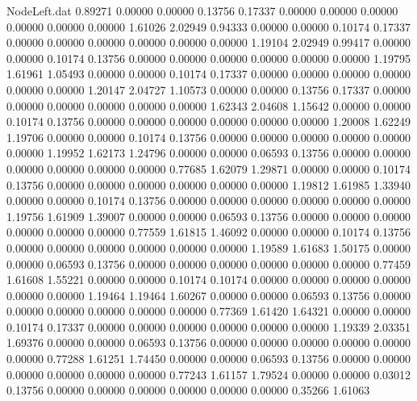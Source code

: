 \begin{filecontents}{NodeLeft.dat}
   0.89271    0.00000    0.00000     0.13756    0.17337    0.00000    0.00000    0.00000    0.00000    0.00000    0.00000    1.61026    2.02949
   0.94333    0.00000    0.00000     0.10174    0.17337    0.00000    0.00000    0.00000    0.00000    0.00000    0.00000    1.19104    2.02949
   0.99417    0.00000    0.00000     0.10174    0.13756    0.00000    0.00000    0.00000    0.00000    0.00000    0.00000    1.19795    1.61961
   1.05493    0.00000    0.00000     0.10174    0.17337    0.00000    0.00000    0.00000    0.00000    0.00000    0.00000    1.20147    2.04727
   1.10573    0.00000    0.00000     0.13756    0.17337    0.00000    0.00000    0.00000    0.00000    0.00000    0.00000    1.62343    2.04608
   1.15642    0.00000    0.00000     0.10174    0.13756    0.00000    0.00000    0.00000    0.00000    0.00000    0.00000    1.20008    1.62249
   1.19706    0.00000    0.00000     0.10174    0.13756    0.00000    0.00000    0.00000    0.00000    0.00000    0.00000    1.19952    1.62173
   1.24796    0.00000    0.00000     0.06593    0.13756    0.00000    0.00000    0.00000    0.00000    0.00000    0.00000    0.77685    1.62079
   1.29871    0.00000    0.00000     0.10174    0.13756    0.00000    0.00000    0.00000    0.00000    0.00000    0.00000    1.19812    1.61985
   1.33940    0.00000    0.00000     0.10174    0.13756    0.00000    0.00000    0.00000    0.00000    0.00000    0.00000    1.19756    1.61909
   1.39007    0.00000    0.00000     0.06593    0.13756    0.00000    0.00000    0.00000    0.00000    0.00000    0.00000    0.77559    1.61815
   1.46092    0.00000    0.00000     0.10174    0.13756    0.00000    0.00000    0.00000    0.00000    0.00000    0.00000    1.19589    1.61683
   1.50175    0.00000    0.00000     0.06593    0.13756    0.00000    0.00000    0.00000    0.00000    0.00000    0.00000    0.77459    1.61608
   1.55221    0.00000    0.00000     0.10174    0.10174    0.00000    0.00000    0.00000    0.00000    0.00000    0.00000    1.19464    1.19464
   1.60267    0.00000    0.00000     0.06593    0.13756    0.00000    0.00000    0.00000    0.00000    0.00000    0.00000    0.77369    1.61420
   1.64321    0.00000    0.00000     0.10174    0.17337    0.00000    0.00000    0.00000    0.00000    0.00000    0.00000    1.19339    2.03351
   1.69376    0.00000    0.00000     0.06593    0.13756    0.00000    0.00000    0.00000    0.00000    0.00000    0.00000    0.77288    1.61251
   1.74450    0.00000    0.00000     0.06593    0.13756    0.00000    0.00000    0.00000    0.00000    0.00000    0.00000    0.77243    1.61157
   1.79524    0.00000    0.00000     0.03012    0.13756    0.00000    0.00000    0.00000    0.00000    0.00000    0.00000    0.35266    1.61063

\end{filecontents}
